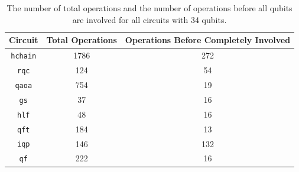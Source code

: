 \begin{table}[t!]
\centering
\caption{The number of total operations and the number of operations before all qubits are involved for all circuits with 34 qubits.}
\begin{tabular}{||c|c|c||} 
 \hline
 Circuit & Total Operations & Operations Before Completely Involved  \\ [0.5ex] 
 \hline\hline
 {\tt hchain} & 1786 & 272 \\ 
 \hline
 {\tt rqc} & 124 & 54 \\
 \hline
 {\tt qaoa} & 754 & 19 \\
 \hline
 {\tt gs} & 37 & 16 \\
 \hline
 {\tt hlf} & 48 & 16 \\
 \hline
 {\tt qft} & 184 & 13 \\
 \hline
 {\tt iqp} & 146 & 132 \\
 \hline
 {\tt qf} & 222 & 16 \\ [1ex] 
 \hline
\end{tabular}
\label{tab-inv}
\end{table}


